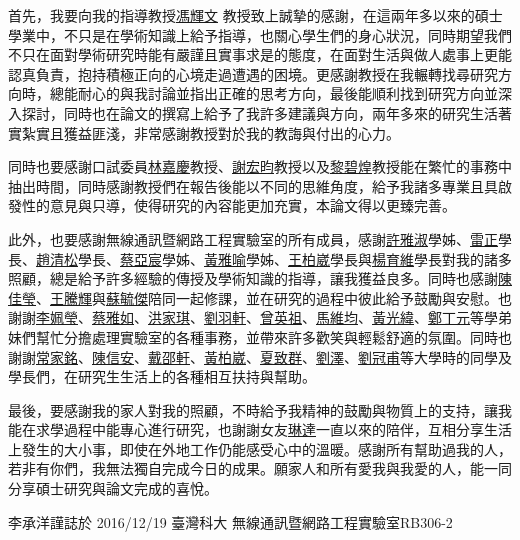 首先，我要向我的指導教授\underline{馮輝文} 教授致上誠摯的感謝，在這兩年多以來的碩士學業中，不只是在學術知識上給予指導，也關心學生們的身心狀況，同時期望我們不只在面對學術研究時能有嚴謹且實事求是的態度，在面對生活與做人處事上更能認真負責，抱持積極正向的心境走過遭遇的困境。更感謝教授在我輾轉找尋研究方向時，總能耐心的與我討論並指出正確的思考方向，最後能順利找到研究方向並深入探討，同時也在論文的撰寫上給予了我許多建議與方向，兩年多來的研究生活著實紮實且獲益匪淺，非常感謝教授對於我的教誨與付出的心力。

同時也要感謝口試委員\underline{林嘉慶}教授、\underline{謝宏昀}教授以及\underline{黎碧煌}教授能在繁忙的事務中抽出時間，同時感謝教授們在報告後能以不同的思維角度，給予我諸多專業且具啟發性的意見與只導，使得研究的內容能更加充實，本論文得以更臻完善。

此外，也要感謝無線通訊暨網路工程實驗室的所有成員，感謝\underline{許雅淑}學姊、\underline{雷正}學長、\underline{趙清松}學長、\underline{蔡亞宸}學姊、\underline{黃雅喻}學姊、\underline{王柏崴}學長與\underline{楊育維}學長對我的諸多照顧，總是給予許多經驗的傳授及學術知識的指導，讓我獲益良多。同時也感謝\underline{陳佳瑩}、\underline{王騰輝}與\underline{蘇毓傑}陪同一起修課，並在研究的過程中彼此給予鼓勵與安慰。也謝謝\underline{李姵瑩}、\underline{蔡雅如}、\underline{洪家琪}、\underline{劉羽軒}、\underline{曾英祖}、\underline{馬維均}、\underline{黃光緯}、\underline{鄭丁元}等學弟妹們幫忙分擔處理實驗室的各種事務，並帶來許多歡笑與輕鬆舒適的氛圍。同時也謝謝\underline{常家銘}、\underline{陳信安}、\underline{戴邵軒}、\underline{黃柏崴}、\underline{夏致群}、\underline{劉澤}、\underline{劉冠甫}等大學時的同學及學長們，在研究生生活上的各種相互扶持與幫助。

最後，要感謝我的家人對我的照顧，不時給予我精神的鼓勵與物質上的支持，讓我能在求學過程中能專心進行研究，也謝謝女友\underline{琳達}一直以來的陪伴，互相分享生活上發生的大小事，即使在外地工作仍能感受心中的溫暖。感謝所有幫助過我的人，若非有你們，我無法獨自完成今日的成果。願家人和所有愛我與我愛的人，能一同分享碩士研究與論文完成的喜悅。


\begin{flushright}
李承洋\quad 謹誌於 2016/12/19 臺灣科大 無線通訊暨網路工程實驗室RB306-2
\end{flushright}

